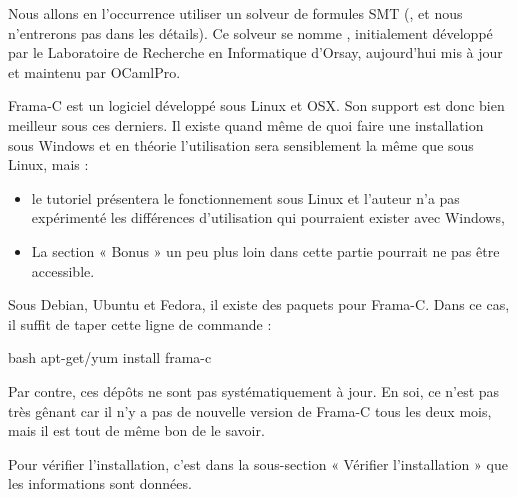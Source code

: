 \documentclass[middle]{zmdocument}
\begin{document}
Nous allons en l'occurrence utiliser un solveur de formules SMT
(,
et nous n'entrerons pas dans les détails). Ce solveur se nomme 
, initialement développé par le Laboratoire
de Recherche en Informatique d'Orsay, aujourd'hui mis à jour et maintenu par
OCamlPro.





Frama-C est un logiciel développé sous Linux et OSX. Son support est donc bien
meilleur sous ces derniers. Il existe quand même de quoi faire une installation 
sous Windows et en théorie l'utilisation sera sensiblement la même que sous 
Linux, mais :



\begin{Warning}
\begin{itemize}
\item le tutoriel présentera le fonctionnement sous Linux et l'auteur n'a pas 
expérimenté les différences d'utilisation qui pourraient exister avec 
Windows,
\item La section « Bonus » un peu plus loin dans cette partie pourrait ne pas être
accessible.
\end{itemize}
\end{Warning}






Sous Debian, Ubuntu et Fedora, il existe des paquets pour Frama-C. Dans ce cas, 
il suffit de taper cette ligne de commande :



\begin{CodeBlock}{bash}
apt-get/yum install frama-c
\end{CodeBlock}



Par contre, ces dépôts ne sont pas systématiquement à jour. En soi, ce n'est pas très gênant car il n'y a pas de nouvelle version de Frama-C tous les deux mois, mais il est tout de même bon de le savoir.



Pour vérifier l'installation, c'est dans la sous-section « Vérifier l'installation »
que les informations sont données.



\end{document}
